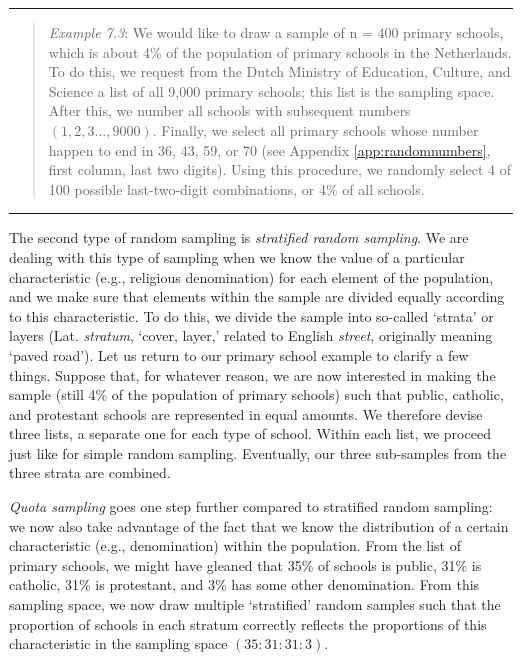 \documentclass[
]{book}
\begin{document}
\begin{center}\rule{0.5\linewidth}{0.5pt}\end{center}

\begin{quote}
\emph{Example 7.3}: We would like to draw a sample of n = 400 primary schools, which is about 4\% of the population of primary schools in the Netherlands. To do this, we request from the Dutch Ministry of Education, Culture, and Science a list of all 9,000 primary schools; this list is the sampling space. After this, we number all schools with subsequent numbers \((1, 2, 3 \ldots, 9000)\). Finally, we select all primary schools whose number happen to end in 36, 43, 59, or 70 (see Appendix \ref{app:randomnumbers}, first column, last two digits). Using this procedure, we randomly select 4 of 100 possible last-two-digit combinations, or 4\% of all schools.
\end{quote}

\begin{center}\rule{0.5\linewidth}{0.5pt}\end{center}

The second type of random sampling is \emph{stratified random sampling}. We are dealing with this type of sampling when we know the value of a particular characteristic (e.g., religious denomination) for each element of the population, and we make sure that elements within the sample are divided equally according to this characteristic. To do this, we divide the sample into so-called `strata' or layers (Lat. \emph{stratum}, `cover, layer,' related to English \emph{street}, originally meaning `paved road'). Let us return to our primary school example to clarify a few things. Suppose that, for whatever reason, we are now interested in making the sample (still 4\% of the population of primary schools) such that public, catholic, and protestant schools are represented in equal amounts. We therefore devise three lists, a separate one for each type of school. Within each list, we proceed just like for simple random sampling. Eventually, our three sub-samples from the three strata are combined.

\emph{Quota sampling} goes one step further compared to stratified random sampling: we now also take advantage of the fact that we know the distribution of a certain characteristic (e.g., denomination) within the population. From the list of primary schools, we might have gleaned that 35\% of schools is public, 31\% is catholic, 31\% is protestant, and 3\% has some other denomination. From this sampling space, we now draw multiple `stratified' random samples such that the proportion of schools in each stratum correctly reflects the proportions of this characteristic in the sampling space \((35 : 31 : 31 : 3)\).
\end{document}
